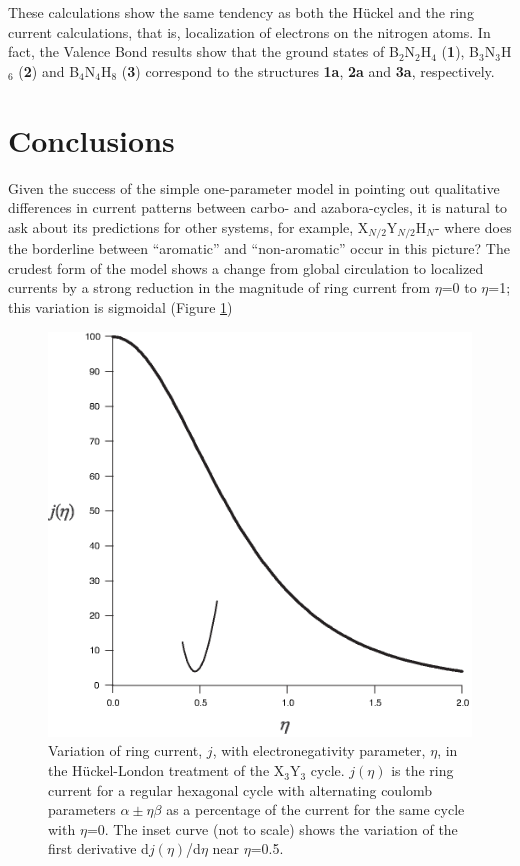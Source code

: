 These calculations show the same tendency as both the H\"uckel and the ring current calculations, that is, localization
of electrons on the nitrogen atoms. In fact, the Valence Bond results show that the ground states of B$_2$N$_2$H$_4$ (\textbf{1}), B$_3$N$_3$H$_6$
(\textbf{2}) and B$_4$N$_4$H$_8$ (\textbf{3}) correspond to the structures \textbf{1a}, \textbf{2a} \cite{r37} and \textbf{3a}, respectively.

\section{Conclusions}

Given the success of the simple one-parameter model in pointing out qualitative differences in current patterns between
carbo- and azabora-cycles, it is natural to ask about its predictions for other systems, for example, X$_{N/2}$Y$_{N/2}$H$_N$-
where does the borderline between ``aromatic'' and ``non-aromatic'' occur in this picture? The crudest form of the
model shows a change from global circulation to localized currents by a strong reduction in the magnitude of ring current
from $\eta$=0 to $\eta$=1; this variation is sigmoidal (Figure \ref{ch5.fig.f07})
\begin{figure}
\begin{center}
\includegraphics{huckel/figures/fig7.eps}
\end{center}
\caption{
Variation of ring current, $j$, with electronegativity parameter, $\eta$,
in the H\"uckel-London treatment of the X$_3$Y$_3$ cycle. $j(\eta)$ is the ring current
for a regular hexagonal cycle with alternating coulomb parameters
$\alpha \pm \eta \beta$ as a percentage of the current for the same cycle with $\eta$=0. The
inset curve (not to scale) shows the variation of the first derivative d$j(\eta)$/d$\eta$ near $\eta$=0.5.
}
\label{ch5.fig.f07}
\end{figure}
